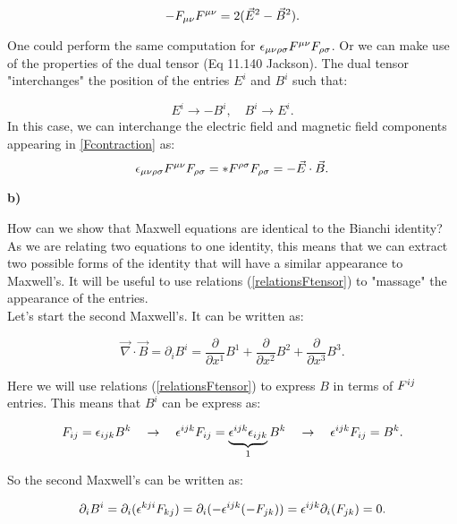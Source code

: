 \begin{equation}\label{result1}
	- F_{\mu\nu } F^{\mu\nu }  = 2 (\vec{E}^{2} - \vec{B}^2).
\end{equation}

One could perform the same computation for $\epsilon_{\mu\nu\rho\sigma}F^{\mu\nu }F_{\rho\sigma }$. Or we can make use of the properties of the dual tensor (Eq 11.140 Jackson). The dual tensor "interchanges" the position of the entries $E^{i}$ and $B^{i}$ such that:

\begin{equation}\label{dualtensor}
	E^{i} \rightarrow - B^{i}, \quad B^{i} \rightarrow E^{i}.
\end{equation}
In this case, we can interchange the electric field and magnetic field components appearing in \ref{Fcontraction} as:
\begin{equation}\label{result2}
	\epsilon_{\mu\nu\rho\sigma}F^{\mu\nu }F_{\rho\sigma } = *F^{\rho\sigma } F_{\rho\sigma } = - \vec{E}\cdot \vec{B}.
\end{equation}

\textbf{b)}

How can we show that Maxwell equations are identical to the Bianchi identity? As we are relating two equations to one identity, this means that we can extract two possible forms of the identity that will have a similar appearance to Maxwell's. It will be useful to use relations (\ref{relationsFtensor}) to "massage" the appearance of the entries.\\
Let's start the second Maxwell's. It can be written as:

\begin{equation}
	\vec{\nabla}\cdot \vec{B} = \partial_{i} B^{i} = \frac{\partial}{\partial x ^{1}}B^{1}+ \frac{\partial}{\partial x ^{2}}B^{2}+ \frac{\partial}{\partial x ^{3}}B^{3}.
\end{equation}

Here we will use relations (\ref{relationsFtensor}) to express $B$ in terms of $F^{ij }$ entries. This means that $B^{i}$ can be express as:

\begin{equation}
	F_{ij } = \epsilon_{ijk}B^{k} \quad \rightarrow \quad \epsilon^{ijk} F_{ij } = \underbrace{\epsilon^{ijk}\epsilon_{ijk}}_{\text{$1$}}B^{k} \quad \rightarrow \quad \epsilon^{ijk}F_{ij} = B^{k}.
\end{equation}

So the second Maxwell's can be written as:
	
\begin{equation}\label{secondmaxwellformalism}
	\partial_{i} B^{i} = \partial_{i} (\epsilon^{kji}F_{kj }) = \partial_{i}(-\epsilon^{ijk}(-F_{jk })) = \epsilon^{ijk} \partial_{i}(F_{jk }) = 0.
\end{equation}

